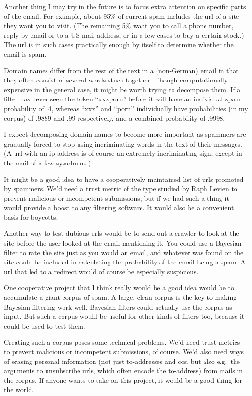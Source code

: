Another thing I may try in the future is to focus extra attention on
specific parts of the email. For example, about 95\% of current spam
includes the url of a site they want you to visit. (The remaining 5\%
want you to call a phone number, reply by email or to a US mail address,
or in a few cases to buy a certain stock.) The url is in such cases
practically enough by itself to determine whether the email is spam.

Domain names differ from the rest of the text in a (non-German) email in
that they often consist of several words stuck together. Though
computationally expensive in the general case, it might be worth trying
to decompose them. If a filter has never seen the token ``xxxporn''
before it will have an individual spam probability of .4, whereas
``xxx'' and ``porn'' individually have probabilities (in my corpus) of
.9889 and .99 respectively, and a combined probability of .9998.

I expect decomposing domain names to become more important as spammers
are gradually forced to stop using incriminating words in the text of
their messages. (A url with an ip address is of course an extremely
incriminating sign, except in the mail of a few sysadmins.)

It might be a good idea to have a cooperatively maintained list of urls
promoted by spammers. We'd need a trust metric of the type studied by
Raph Levien to prevent malicious or incompetent submissions, but if we
had such a thing it would provide a boost to any filtering software. It
would also be a convenient basis for boycotts.

Another way to test dubious urls would be to send out a crawler to look
at the site before the user looked at the email mentioning it. You could
use a Bayesian filter to rate the site just as you would an email, and
whatever was found on the site could be included in calculating the
probability of the email being a spam. A url that led to a redirect
would of course be especially suspicious.

One cooperative project that I think really would be a good idea would
be to accumulate a giant corpus of spam. A large, clean corpus is the
key to making Bayesian filtering work well. Bayesian filters could
actually use the corpus as input. But such a corpus would be useful for
other kinds of filters too, because it could be used to test them.

Creating such a corpus poses some technical problems. We'd need trust
metrics to prevent malicious or incompetent submissions, of course. We'd
also need ways of erasing personal information (not just to-addresses
and ccs, but also e.g.~the arguments to unsubscribe urls, which often
encode the to-address) from mails in the corpus. If anyone wants to take
on this project, it would be a good thing for the world.

